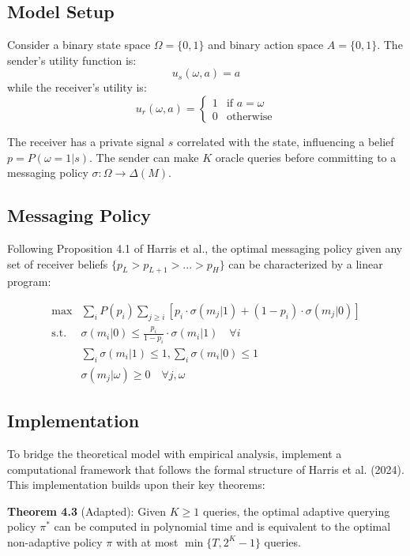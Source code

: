 \documentclass[12pt]{article}
\theoremstyle{plain}
\theoremstyle{definition}
\theoremstyle{remark}
\begin{document}
\subsection{Model Setup}
Consider a binary state space $\Omega = \{0,1\}$ and binary action space $A = \{0,1\}$. The sender's utility function is:
\begin{equation}
    u_s(\omega,a) = a
\end{equation}
while the receiver's utility is:
\begin{equation}
    u_r(\omega,a) = \begin{cases}
        1 & \text{if } a = \omega \\
        0 & \text{otherwise}
    \end{cases}
\end{equation}

The receiver has a private signal $s$ correlated with the state, influencing a belief $p = P(\omega=1|s)$. The sender can make $K$ oracle queries before committing to a messaging policy $\sigma: \Omega \rightarrow \Delta(M)$.

\subsection{Messaging Policy}
Following Proposition 4.1 of Harris et al., the optimal messaging policy given any set of receiver beliefs $\{p_L > p_{L+1} > ... > p_H\}$ can be characterized by a linear program:

\begin{align*}
    \max &\sum_i P(p_i) \sum_{j\geq i} [p_i\cdot\sigma(m_j|1) + (1-p_i)\cdot\sigma(m_j|0)] \\
    \text{s.t. } &\sigma(m_i|0) \leq \frac{p_i}{1-p_i}\cdot\sigma(m_i|1) \quad \forall i \\
    &\sum_i \sigma(m_i|1) \leq 1, \sum_i \sigma(m_i|0) \leq 1 \\
    &\sigma(m_j|\omega) \geq 0 \quad \forall j,\omega
\end{align*}

\subsection{Implementation}
To bridge the theoretical model with empirical analysis, implement a computational framework that follows the formal structure of Harris et al. (2024). This implementation builds upon their key theorems:

\textbf{Theorem 4.3} (Adapted): Given $K \geq 1$ queries, the optimal adaptive querying policy $\pi^*$ can be computed in polynomial time and is equivalent to the optimal non-adaptive policy $\pi$ with at most $\min\{T, 2^K - 1\}$ queries.
\end{document}
